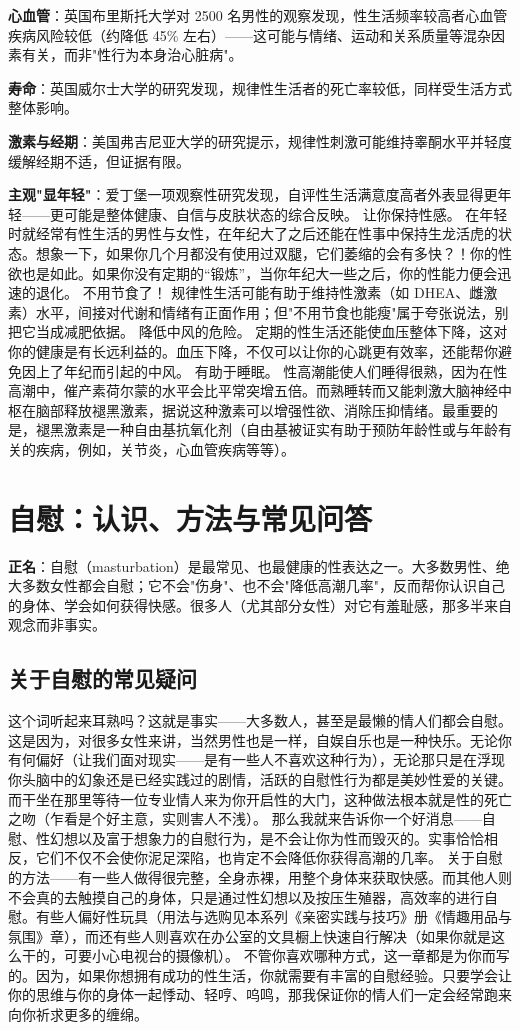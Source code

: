 \documentclass[12pt,UTF8,openany]{ctexbook}
\begin{document}
\textbf{心血管}：英国布里斯托大学对 2500 名男性的观察发现，性生活频率较高者心血管疾病风险较低（约降低 45\% 左右）——这可能与情绪、运动和关系质量等混杂因素有关，而非"性行为本身治心脏病"。

\textbf{寿命}：英国威尔士大学的研究发现，规律性生活者的死亡率较低，同样受生活方式整体影响。

\textbf{激素与经期}：美国弗吉尼亚大学的研究提示，规律性刺激可能维持睾酮水平并轻度缓解经期不适，但证据有限。

\textbf{主观"显年轻"}：爱丁堡一项观察性研究发现，自评性生活满意度高者外表显得更年轻——更可能是整体健康、自信与皮肤状态的综合反映。
让你保持性感。
在年轻时就经常有性生活的男性与女性，在年纪大了之后还能在性事中保持生龙活虎的状态。想象一下，如果你几个月都没有使用过双腿，它们萎缩的会有多快？！你的性欲也是如此。如果你没有定期的“锻炼”，当你年纪大一些之后，你的性能力便会迅速的退化。
不用节食了！
规律性生活可能有助于维持性激素（如 DHEA、雌激素）水平，间接对代谢和情绪有正面作用；但"不用节食也能瘦"属于夸张说法，别把它当成减肥依据。
降低中风的危险。
定期的性生活还能使血压整体下降，这对你的健康是有长远利益的。血压下降，不仅可以让你的心跳更有效率，还能帮你避免因上了年纪而引起的中风。
有助于睡眠。
性高潮能使人们睡得很熟，因为在性高潮中，催产素荷尔蒙的水平会比平常突增五倍。而熟睡转而又能刺激大脑神经中枢在脑部释放褪黑激素，据说这种激素可以增强性欲、消除压抑情绪。最重要的是，褪黑激素是一种自由基抗氧化剂（自由基被证实有助于预防年龄性或与年龄有关的疾病，例如，关节炎，心血管疾病等等）。

\section{自慰：认识、方法与常见问答}

\textbf{正名}：自慰（masturbation）是最常见、也最健康的性表达之一。大多数男性、绝大多数女性都会自慰；它不会"伤身"、也不会"降低高潮几率"，反而帮你认识自己的身体、学会如何获得快感。很多人（尤其部分女性）对它有羞耻感，那多半来自观念而非事实。

\subsection*{关于自慰的常见疑问}
这个词听起来耳熟吗？这就是事实——大多数人，甚至是最懒的情人们都会自慰。这是因为，对很多女性来讲，当然男性也是一样，自娱自乐也是一种快乐。无论你有何偏好（让我们面对现实——是有一些人不喜欢这种行为），无论那只是在浮现你头脑中的幻象还是已经实践过的剧情，活跃的自慰性行为都是美妙性爱的关键。而干坐在那里等待一位专业情人来为你开启性的大门，这种做法根本就是性的死亡之吻（乍看是个好主意，实则害人不浅）。
那么我就来告诉你一个好消息——自慰、性幻想以及富于想象力的自慰行为，是不会让你为性而毁灭的。实事恰恰相反，它们不仅不会使你泥足深陷，也肯定不会降低你获得高潮的几率。
关于自慰的方法——有一些人做得很完整，全身赤裸，用整个身体来获取快感。而其他人则不会真的去触摸自己的身体，只是通过性幻想以及按压生殖器，高效率的进行自慰。有些人偏好性玩具（用法与选购见本系列《亲密实践与技巧》册《情趣用品与氛围》章），而还有些人则喜欢在办公室的文具橱上快速自行解决（如果你就是这么干的，可要小心电视台的摄像机）。
不管你喜欢哪种方式，这一章都是为你而写的。因为，如果你想拥有成功的性生活，你就需要有丰富的自慰经验。只要学会让你的思维与你的身体一起悸动、轻哼、呜鸣，那我保证你的情人们一定会经常跑来向你祈求更多的缠绵。
\end{document}
